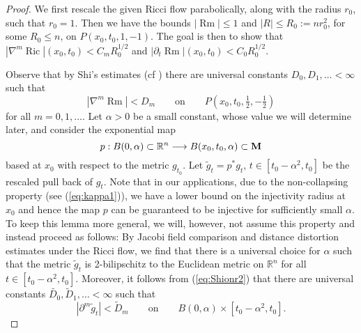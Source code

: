 \documentclass[11pt]{amsart}
\numberwithin{equation}{section}
\def\M{{\bf M}}
\DeclareMathOperator{\Ric}{Ric}
\DeclareMathOperator{\Rm}{Rm}
\numberwithin{equation}{section}
\begin{document}
\begin{proof}
We first rescale the given Ricci flow parabolically, along with the radius $r_0$, such that $r_0 = 1$.
Then we have the bounds $|{\Rm}| \leq 1$ and $|R| \leq R_0 := n r_0^2$, for some $R_0 \leq n$, on $P(x_0, t_0, 1, -1)$.
The goal is then to show that $|\nabla^m {\Ric}| (x_0, t_0) < C_m R_0^{1/2}$ and $|\partial_t {\Rm}| (x_0,t_0) < C_0  R_0^{1/2}$.

Observe that by Shi's estimates (cf \cite{Sh:1}) there are universal constants $D_0, D_1, \ldots < \infty$ such that
\begin{equation} \label{eq:Shionr2}
 |{\nabla^m \Rm}| < D_m  \qquad \text{on} \qquad P (x_0, t_0, \tfrac12 , - \tfrac12)
\end{equation}
for all $m = 0,1, \ldots$.
Let $\alpha > 0$ be a small constant, whose value we will determine later, and consider the exponential map
\[ p : B(0,\alpha) \subset \mathbb{R}^n \longrightarrow B(x_0, t_0,\alpha ) \subset \M \]
based at $x_0$ with respect to the metric $g_{t_0}$.
Let $\widetilde{g}_t = p^* g_t$, $t \in [t_0 - \alpha^2, t_0]$ be the rescaled pull back of $g_t$.
Note that in our applications, due to the non-collapsing property (see (\ref{eq:kappa1})), we have a lower bound on the injectivity radius at $x_0$ and hence the map $p$ can be guaranteed to be injective for sufficiently small $\alpha$.
To keep this lemma more general, we will, however, not assume this property and instead proceed as follows:
By Jacobi field comparison and distance distortion estimates under the Ricci flow, we find that there is a universal choice for $\alpha$ such that the metric $\widetilde{g}_t$ is 2-bilipschitz to the Euclidean metric on $\mathbb{R}^n$ for all $t \in [ t_0 - \alpha^2, t_0]$.
Moreover, it follows from (\ref{eq:Shionr2}) that there are universal constants $\widetilde{D_0}, \widetilde{D}_1, \ldots < \infty$ such that
\[ |{\partial^m \widetilde{g}_t}| < \widetilde{D}_m  \qquad \text{on} \qquad B(0, \alpha ) \times [t_0 - \alpha^2 , t_0]. \]


\end{proof}
\end{document}
